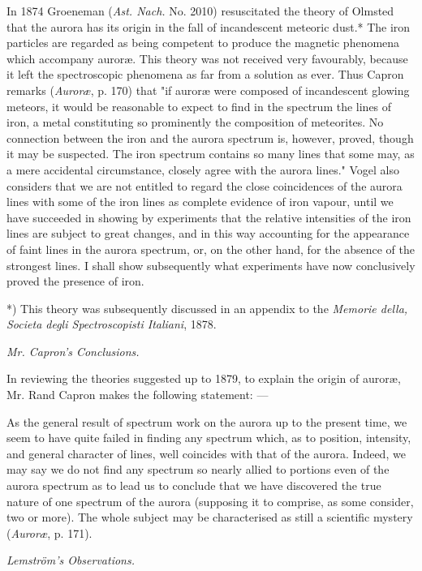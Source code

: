 \documentclass[a4paper, 12pt, oneside, polutonikogreek, english]{article}
\begin{document}
In 1874 Groeneman (\emph{Ast. Nach.} No. 2010) resuscitated the theory of Olmsted that the aurora has its origin in the fall of incandescent meteoric dust.* The iron particles are regarded as being competent to produce the magnetic phenomena which accompany auroræ. This theory was not received very favourably, because it left the spectroscopic phenomena as far from a solution as ever. Thus Capron remarks (\emph{Auroræ}, p. 170) that "if auroræ were composed of incandescent glowing meteors, it would be reasonable to expect to find in the spectrum the lines of iron, a metal constituting so prominently the composition of meteorites. No connection between the iron and the aurora spectrum is, however, proved, though it may be suspected. The iron spectrum contains so many lines that some may, as a mere accidental circumstance, closely agree with the aurora lines." Vogel also considers that we are not entitled to regard the close coincidences of the aurora lines with some of the iron lines as complete evidence of iron vapour, until we have succeeded in showing by experiments that the relative intensities of the iron lines are subject to great changes, and in this way accounting for the appearance of faint lines in the aurora spectrum, or, on the other hand, for the absence of the strongest lines. I shall show subsequently what experiments have now conclusively proved the presence of iron.

*) This theory was subsequently discussed in an appendix to the \emph{Memorie della, Societa degli Spectroscopisti Italiani}, 1878.

\emph{Mr. Capron's Conclusions.}

In reviewing the theories suggested up to 1879, to explain the origin of auroræ, Mr. Rand Capron makes the following statement: ---

As the general result of spectrum work on the aurora up to the present time, we seem to have quite failed in finding any spectrum which, as to position, intensity, and general character of lines, well coincides with that of the aurora. Indeed, we may say we do not find any spectrum so nearly allied to portions even of the aurora spectrum as to lead us to conclude that we have discovered the true nature of one spectrum of the aurora (supposing it to comprise, as some consider, two or more). The whole subject may be characterised as still a scientific mystery (\emph{Auroræ}, p. 171).

\emph{Lemström's Observations.}
\end{document}

